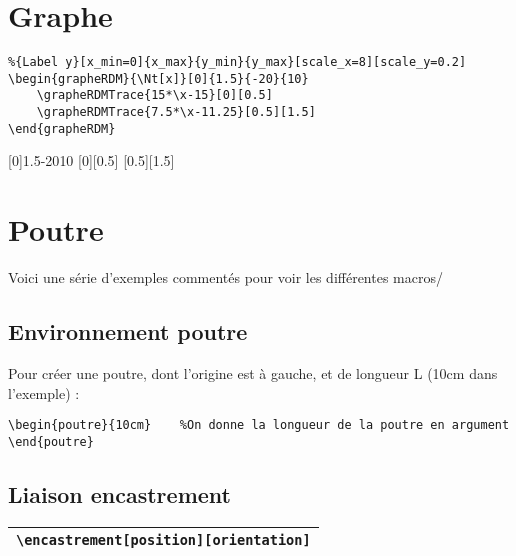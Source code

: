 \documentclass[a4paper,10pt]{article}
\begin{document}
	\section{Graphe}
	\begin{verbatim}
%{Label y}[x_min=0]{x_max}{y_min}{y_max}[scale_x=8][scale_y=0.2]
\begin{grapheRDM}{\Nt[x]}[0]{1.5}{-20}{10}
    \grapheRDMTrace{15*\x-15}[0][0.5]
    \grapheRDMTrace{7.5*\x-11.25}[0.5][1.5]
\end{grapheRDM}
    \end{verbatim}

\begin{grapheRDM}{\Nt[x]}[0]{1.5}{-20}{10}
    [0][0.5]
    [0.5][1.5]
\end{grapheRDM}


	\section{Poutre}

	Voici une série d'exemples commentés pour voir les différentes macros/
	
	\subsection{Environnement poutre}
        Pour créer une poutre, dont l'origine est à gauche, et de longueur L (10cm dans l'exemple) :

        \begin{verbatim}
\begin{poutre}{10cm}    %On donne la longueur de la poutre en argument
\end{poutre}
        \end{verbatim}

        \begin{poutre}{10cm}
        \end{poutre}
	
    
    \subsection{Liaison encastrement}
	
	\begin{center}
        \begin{tabular}{|c|}
            \hline
            \verb!\encastrement[position][orientation]!
            \\\hline
        \end{tabular}
    \end{center}
	
\end{document}
